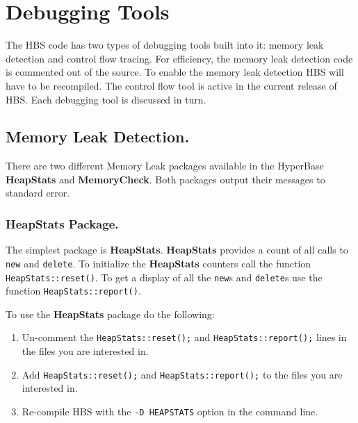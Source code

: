 \section{Debugging Tools}
\label{sec:debugging}

The HBS code has two types of debugging tools built into it: memory leak
detection and control flow tracing.  For efficiency, the memory
leak detection code is commented out of the source.  To enable the memory
leak detection HBS will have to be recompiled.  The control flow tool
is active in the current release of HBS.  Each debugging tool is discussed
in turn.

\subsection{Memory Leak Detection.}

There are two different Memory Leak packages available in the HyperBase
{\bf HeapStats} and {\bf MemoryCheck}.  Both packages output their messages
to standard error.

\subsubsection{HeapStats Package.}

The simplest package is {\bf HeapStats}\cite{Cargill92}.  {\bf HeapStats}
provides a count of all calls to {\tt new} and {\tt delete}.  To initialize
the {\bf HeapStats} counters call the function {\tt HeapStats::reset()}.
To get a display of all the {\tt new}s and {\tt delete}s use the function
{\tt HeapStats::report()}.

To use the {\bf HeapStats} package do the following:

\begin{enumerate}
\item{Un-comment the {\tt HeapStats::reset();} and {\tt HeapStats::report();}
lines in the files you are interested in.}
\item{Add {\tt HeapStats::reset();} and {\tt HeapStats::report();} to the
files you are interested in.}
\item{Re-compile HBS with the {\tt -D HEAPSTATS} option in the command line.}
\end{enumerate}
